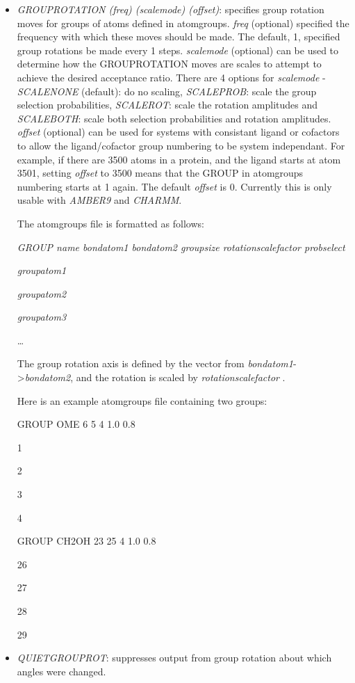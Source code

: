 \documentclass[12pt,a4paper,dvips]{article}
\begin{document}
\begin{itemize}
\item {\it GROUPROTATION (freq) (scalemode) (offset)\/}: specifies group rotation moves for groups of atoms defined in {\rm atomgroups}. {\it freq\/} 
(optional) specified the frequency with which these moves should be made. The default, 1, specified group rotations be made every 1 steps. 
{\it scalemode\/} (optional) can be used to determine how the GROUPROTATION moves are scales to attempt to achieve the desired acceptance ratio.
There are 4 options for {\it scalemode} - {\it SCALENONE\/} (default): do no scaling, {\it SCALEPROB\/}: scale the group selection probabilities, {\it SCALEROT}: scale
the rotation amplitudes and {\it SCALEBOTH}: scale both selection probabilities and rotation amplitudes.
{\it offset\/} (optional) can be used for systems with consistant ligand or cofactors to allow the ligand/cofactor group numbering to be
system independant. For example, if there are 3500 atoms in a protein, and the ligand starts at atom 3501, setting {\it offset} to 3500 means
that the GROUP in {\textrm atomgroups} numbering starts at 1 again. The default {\it offset\/} is 0. Currently this is only usable with 
{\it AMBER9\/} and {\it CHARMM\/}.

The {\textrm atomgroups} file is formatted as follows:

{\it GROUP name bondatom1 bondatom2 groupsize rotationscalefactor probselect}

{\it groupatom1}

{\it groupatom2}

{\it groupatom3}

\ldots

The group rotation axis is defined by the vector from {\it bondatom1}-\textgreater{\it bondatom2}, and the rotation is scaled by {\it rotationscalefactor}
.

Here is an example {\textrm atomgroups} file containing two groups:

{\textrm GROUP OME 6 5 4 1.0 0.8}

{\textrm 1}

{\textrm 2}

{\textrm 3}

{\textrm 4}

{\textrm GROUP CH2OH 23 25 4 1.0 0.8}

{\textrm 26}

{\textrm 27}

{\textrm 28}

{\textrm 29}

\item {\it QUIETGROUPROT}: suppresses output from group rotation about which angles were changed.


\end{itemize}
\end{document}
